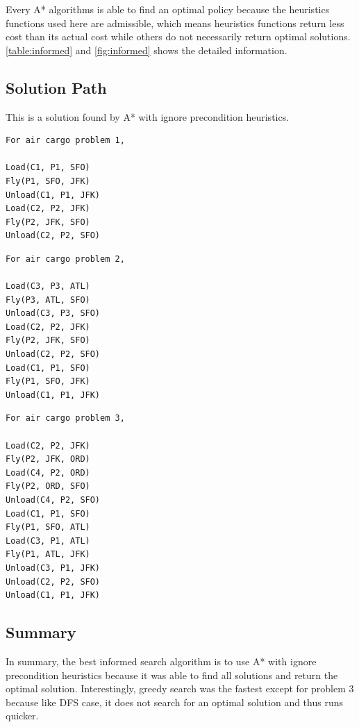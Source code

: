 \documentclass[letterpaper]{article}
\begin{document}
Every A* algorithms is able to find an optimal policy because the heuristics functions used here are admissible, which means heuristics functions return less cost than its actual cost while others do not necessarily return optimal solutions.
\autoref{table:informed} and \autoref{fig:informed} shows the detailed information.

\subsection*{Solution Path}
This is a solution found by A* with ignore precondition heuristics. 
\begin{multicols}{3}

\begin{verbatim}
For air cargo problem 1,

Load(C1, P1, SFO)
Fly(P1, SFO, JFK)
Unload(C1, P1, JFK)
Load(C2, P2, JFK)
Fly(P2, JFK, SFO)
Unload(C2, P2, SFO)
\end{verbatim}
\columnbreak

\begin{verbatim}
For air cargo problem 2, 

Load(C3, P3, ATL)
Fly(P3, ATL, SFO)
Unload(C3, P3, SFO)
Load(C2, P2, JFK)
Fly(P2, JFK, SFO)
Unload(C2, P2, SFO)
Load(C1, P1, SFO)
Fly(P1, SFO, JFK)
Unload(C1, P1, JFK)
\end{verbatim}
\columnbreak

\begin{verbatim}
For air cargo problem 3, 

Load(C2, P2, JFK)
Fly(P2, JFK, ORD)
Load(C4, P2, ORD)
Fly(P2, ORD, SFO)
Unload(C4, P2, SFO)
Load(C1, P1, SFO)
Fly(P1, SFO, ATL)
Load(C3, P1, ATL)
Fly(P1, ATL, JFK)
Unload(C3, P1, JFK)
Unload(C2, P2, SFO)
Unload(C1, P1, JFK)
\end{verbatim} 

\end{multicols}
\subsection*{Summary}
In summary, the best informed search algorithm is to use A* with ignore precondition heuristics because it was able to find all solutions and return the optimal solution.
Interestingly, greedy search was the fastest except for problem 3 because like DFS case, it does not search for an optimal solution and thus runs quicker.
\end{document}

